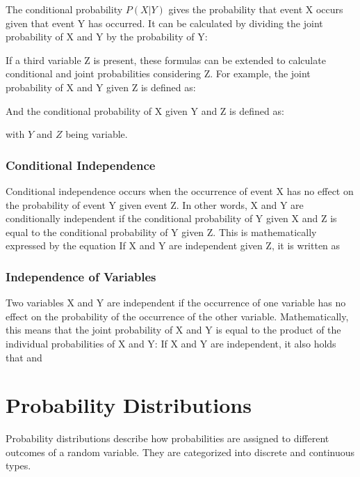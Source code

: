 
The conditional probability $P(X|Y)$ gives the probability that event X occurs given that event Y has occurred. It can be calculated by dividing the joint probability of X and Y by the probability of Y:


If a third variable Z is present, these formulas can be extended to calculate conditional and joint probabilities considering Z. For example, the joint probability of X and Y given Z is defined as:


And the conditional probability of X given Y and Z is defined as:


with $Y$ and $Z$ being variable.

\subsubsection{Conditional Independence}\label{Conditional Independence} 
Conditional independence occurs when the occurrence of event X has no effect on the probability of event Y given event Z. In other words, X and Y are conditionally independent if the conditional probability of Y given X and Z is equal to the conditional probability of Y given Z. This is mathematically expressed by the equation 
If X and Y are independent given Z, it is written as 

\subsubsection{Independence of Variables}\label{Independence of Variables} 
Two variables X and Y are independent if the occurrence of one variable has no effect on the probability of the occurrence of the other variable. Mathematically, this means that the joint probability of X and Y is equal to the product of the individual probabilities of X and Y:
If X and Y are independent, it also holds that  and 

\section{Probability Distributions}\label{Probability Distributions}
Probability distributions describe how probabilities are assigned to different outcomes of a random variable. They are categorized into discrete and continuous types.

